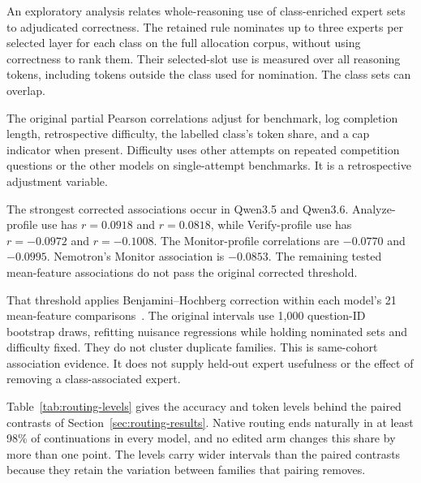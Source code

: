 \FloatBarrier
{}

An exploratory analysis relates whole-reasoning use of class-enriched expert sets to adjudicated correctness.
%
The retained rule nominates up to three experts per selected layer for each class on the full allocation corpus, without using correctness to rank them.
%
Their selected-slot use is measured over all reasoning tokens, including tokens outside the class used for nomination.
%
The class sets can overlap.
%

The original partial Pearson correlations adjust for benchmark, log completion length, retrospective difficulty, the labelled class's token share, and a cap indicator when present.
%
Difficulty uses other attempts on repeated competition questions or the other models on single-attempt benchmarks.
%
It is a retrospective adjustment variable.
%

The strongest corrected associations occur in Qwen3.5 and Qwen3.6.
%
Analyze-profile use has $r=0.0918$ and $r=0.0818$, while Verify-profile use has $r=-0.0972$ and $r=-0.1008$.
%
The Monitor-profile correlations are $-0.0770$ and $-0.0995$.
%
Nemotron's Monitor association is $-0.0853$.
%
The remaining tested mean-feature associations do not pass the original corrected threshold.
%

That threshold applies Benjamini--Hochberg correction within each model's 21 mean-feature comparisons~\citep{benjamini1995fdr}.
%
The original intervals use 1,000 question-ID bootstrap draws, refitting nuisance regressions while holding nominated sets and difficulty fixed.
%
They do not cluster duplicate families.
%
This is same-cohort association evidence.
%
It does not supply held-out expert usefulness or the effect of removing a class-associated expert.
%


Table~\ref{tab:routing-levels} gives the accuracy and token levels behind the paired contrasts of Section~\ref{sec:routing-results}.
%
Native routing ends naturally in at least 98\% of continuations in every model, and no edited arm changes this share by more than one point.
%
The levels carry wider intervals than the paired contrasts because they retain the variation between families that pairing removes.
%



